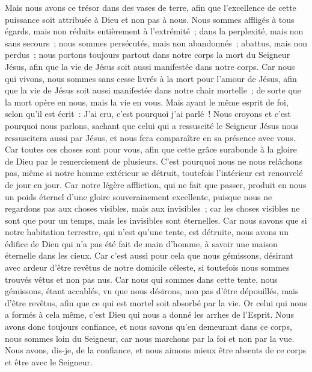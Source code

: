 \begin{multicols}{2}
Mais nous avons ce trésor dans des vases de terre, afin que l'excellence de cette puissance soit attribuée à Dieu et non pas à nous.
Nous sommes affligés à tous égards, mais non réduits entièrement à l'extrémité~; dans la perplexité, mais non sans secours~;
nous sommes persécutés, mais non abandonnés~; abattus, mais non perdus~;
nous portons toujours partout dans notre corps la mort du Seigneur Jésus, afin que la vie de Jésus soit aussi manifestée dans notre corps.
Car nous qui vivons, nous sommes sans cesse livrés à la mort pour l'amour de Jésus, afin que la vie de Jésus soit aussi manifestée dans notre chair mortelle~;
de sorte que la mort opère en nous, mais la vie en vous.
Mais ayant le même esprit de foi, selon qu'il est écrit~: J'ai cru, c'est pourquoi j'ai parlé~! Nous croyons et c'est pourquoi nous parlons,
sachant que celui qui a ressuscité le Seigneur Jésus nous ressuscitera aussi par Jésus, et nous fera comparaître en sa présence avec vous.
Car toutes ces choses sont pour vous, afin que cette grâce surabonde à la gloire de Dieu par le remerciement de plusieurs.
C'est pourquoi nous ne nous relâchons pas, même si notre homme extérieur se détruit, toutefois l'intérieur est renouvelé de jour en jour.
Car notre légère affliction, qui ne fait que passer, produit en nous un poids éternel d'une gloire souverainement excellente,
puisque nous ne regardons pas aux choses visibles, mais aux invisibles~; car les choses visibles ne sont que pour un temps, mais les invisibles sont éternelles.
\VerseOne{}Car nous savons que si notre habitation terrestre, qui n'est qu'une tente, est détruite, nous avons un édifice de Dieu qui n'a pas été fait de main d'homme, à savoir une maison éternelle dans les cieux.
Car c'est aussi pour cela que nous gémissons, désirant avec ardeur d'être revêtus de notre domicile céleste,
si toutefois nous sommes trouvés vêtus et non pas nus.
Car nous qui sommes dans cette tente, nous gémissons, étant accablés, vu que nous désirons, non pas d'être dépouillés, mais d'être revêtus, afin que ce qui est mortel soit absorbé par la vie.
Or celui qui nous a formés à cela même, c'est Dieu qui nous a donné les arrhes de l'Esprit.
Nous avons donc toujours confiance, et nous savons qu'en demeurant dans ce corps, nous sommes loin du Seigneur,
car nous marchons par la foi et non par la vue.
Nous avons, dis-je, de la confiance, et nous aimons mieux être absents de ce corps et être avec le Seigneur.

\end{multicols}
